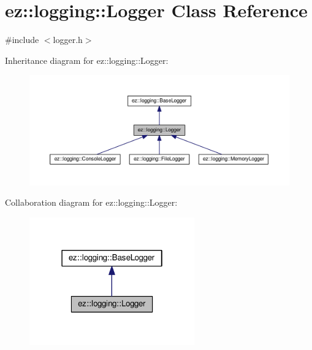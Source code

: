 \hypertarget{classez_1_1logging_1_1Logger}{}\section{ez\+:\+:logging\+:\+:Logger Class Reference}
\label{classez_1_1logging_1_1Logger}


{\ttfamily \#include $<$logger.\+h$>$}



Inheritance diagram for ez\+:\+:logging\+:\+:Logger\+:
\nopagebreak
\begin{figure}[H]
\begin{center}
\leavevmode
\includegraphics[width=350pt]{classez_1_1logging_1_1Logger__inherit__graph}
\end{center}
\end{figure}


Collaboration diagram for ez\+:\+:logging\+:\+:Logger\+:
\nopagebreak
\begin{figure}[H]
\begin{center}
\leavevmode
\includegraphics[width=202pt]{classez_1_1logging_1_1Logger__coll__graph}
\end{center}
\end{figure}
